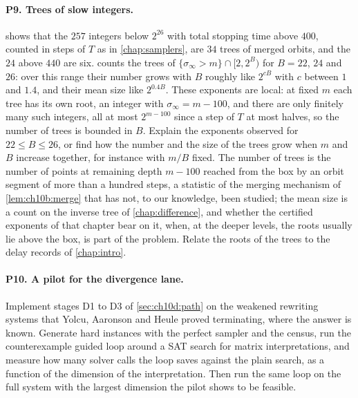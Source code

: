 \paragraph{P9. Trees of slow integers.}  shows that
the $257$ integers below $2^{26}$ with total stopping time above $400$, counted in steps of $T$ as in \cref{chap:samplers}, are $34$
trees of merged orbits, and the $24$ above $440$ are six.  counts the trees
of $\{\sigma_\infty>m\}\cap[2,2^B)$ for $B=22$, $24$ and $26$: over this range their number grows with $B$
roughly like $2^{cB}$ with $c$ between $1$ and $1.4$, and their mean size like
$2^{0.4B}$.
These exponents are local: at fixed $m$ each tree has its own root, an integer with $\sigma_\infty=m-100$, and there are only finitely many such integers, all at most $2^{m-100}$ since a step of $T$ at most halves, so the number of trees is bounded in $B$.
Explain the exponents observed for $22\le B\le26$, or find how the number and the size of the trees grow when $m$ and $B$ increase together, for instance with $m/B$ fixed.
The number of trees is the
number of points at remaining depth $m-100$ reached from the box by an orbit segment of more than a hundred steps, a statistic of the merging mechanism of \cref{lem:ch10b:merge} that has not, to our knowledge, been studied; the mean size is a count on the inverse tree of \cref{chap:difference}, and whether the certified exponents of that chapter bear on it, when, at the deeper levels, the roots usually lie above the box, is part of the problem. Relate the
roots of the trees to the delay records of \cref{chap:intro}.

\paragraph{P10. A pilot for the divergence lane.} Implement stages D1 to D3 of
\cref{sec:ch10d:path} on the weakened rewriting systems that Yolcu, Aaronson and
Heule proved terminating, where the answer is known. Generate hard instances
with the perfect sampler and the census, run the counterexample guided loop
around a SAT search for matrix interpretations, and measure how many solver
calls the loop saves against the plain search, as a function of the dimension
of the interpretation. Then run the same loop on the full system with the
largest dimension the pilot shows to be feasible.

